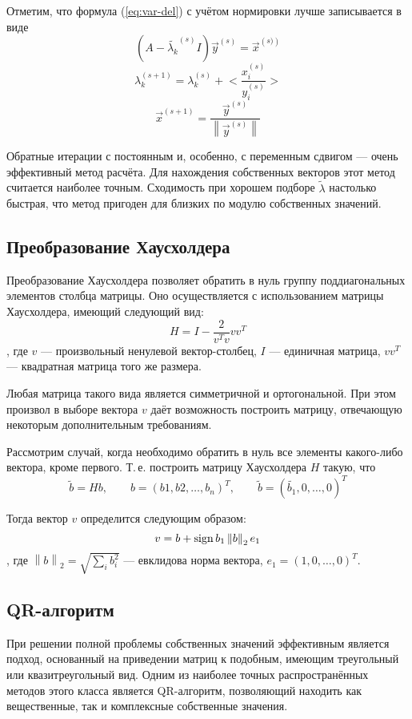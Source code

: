 \documentclass[a4paper,12pt,notitlepage,pdftex,headsepline]{scrartcl}
\def\sign{\mathop{\rm sign}}
\begin{document}
Отметим, что формула (\ref{eq:var-del}) с учётом нормировки лучше записывается в виде
\[
  \left(A - \tilde{\lambda_k}^{\left(s\right)} I \right) \vec{y}^{\left(s\right)} = \vec{x}^{\left(s)\right)}
\]
\[
  \lambda_k^{\left(s+1\right)} = \lambda_k^{\left(s\right)} + \genfrac{<}{>}{1pt}{0}{x_i^{\left(s\right)}}{y_i^{\left(s\right)}}
\]
\begin{equation}
  \label{eq:another-var-del}
  \vec{x}^{\left(s+1\right)} = \frac{\vec{y}^{\left(s\right)}}{\left\| \vec{y}^{\left(s\right)} \right\|}
\end{equation}

Обратные итерации с постоянным и, особенно, с переменным сдвигом --- очень эффективный метод расчёта.
Для нахождения собственных векторов этот метод считается наиболее точным.
Сходимость при хорошем подборе $\tilde{\lambda}$ настолько быстрая, что метод пригоден для близких по модулю собственных значений.
\subsection{Преобразование Хаусхолдера}
\label{ss:hausholder}
Преобразование Хаусхолдера позволяет обратить в нуль группу поддиагональных элементов столбца матрицы.
Оно осуществляется с использованием матрицы Хаусхолдера, имеющий следующий вид:
\begin{equation}
\label{eq:hausholder-matrix}
H = I - \frac{2}{v^T v} v v^T
\end{equation}
, где $v$ --- произвольный ненулевой вектор-столбец, $I$ --- единичная матрица, $v v^T$ --- квадратная матрица того же размера.

Любая матрица такого вида является симметричной и ортогональной.
При этом произвол в выборе вектора $v$ даёт возможность построить матрицу, отвечающую некоторым дополнительным требованиям.

Рассмотрим случай, когда необходимо обратить в нуль все элементы какого-либо вектора, кроме первого.
Т.\,е. построить матрицу Хаусхолдера $H$ такую, что
$$\tilde{b} = H b, \qquad b = \left(b1, b2, \dots, b_n\right)^T, \qquad \tilde{b} = \left(\tilde{b_1}, 0, \dots, 0\right)^T$$

Тогда вектор $v$ определится следующим образом:
$$v = b + \sign{b_1}\left\|b\right\|_2 e_1$$
, где $\left\|b\right\|_2 = \sqrt{\sum\limits_i{b_i^2}}$ --- евклидова норма вектора, $e_1 = \left(1, 0, \dots, 0\right)^T$.

\subsection{QR-алгоритм}
\label{ss:qr}
При решении полной проблемы собственных значений эффективным является подход, основанный на приведении матриц к подобным, имеющим треугольный или квазитреугольный вид.
Одним из наиболее точных распространённых
методов этого класса является QR-алгоритм, позволяющий находить как вещественные, так и комплексные собственные значения.
\end{document}
